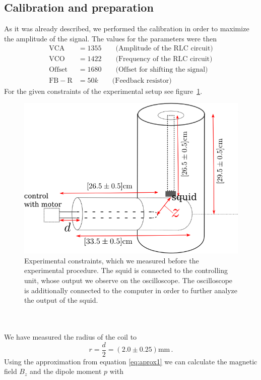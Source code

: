 \subsection{Calibration and preparation}
As it was already described, we performed the calibration in order to maximize the amplitude of the
signal. The values for the parameters were then  \\
\begin{align*}
     \mathrm{VCA} &= 1355 \qquad \text{(Amplitude of the RLC circuit)}\\
     \mathrm{VCO} &= 1422 \qquad\text{(Frequency of the RLC circuit)}\\ 
     \mathrm{Offset} &= 1680 \qquad\text{(Offset for shifting the signal)}\\
     \mathrm{FB-R} &= 50 k \qquad \text{(Feedback resistor)}
\end{align*}
For the given constraints of the experimental setup see figure~\ref{fig:setup1}.
\begin{figure}[htpb]
    \centering
    \includegraphics[width=0.8\linewidth]{figures/setup1}
    \caption{Experimental constraints, which we measured before the experimental procedure. The squid
    is connected to the controlling unit, whose output we observe on the oscilloscope. The oscilloscope
    is additionally connected to the computer in order to further analyze the output of the squid.}
    \label{fig:setup1}
\end{figure}
\\\\
We have measured the radius of the coil to 
\begin{equation}
    r = \frac{d}{2} = (2.0 \pm 0.25) \mathrm{mm} \, .
\end{equation}
Using the approximation from equation \eqref{eq:aprox1} we can calculate the
magnetic field $B_z$ and the dipole moment $p$ with 
